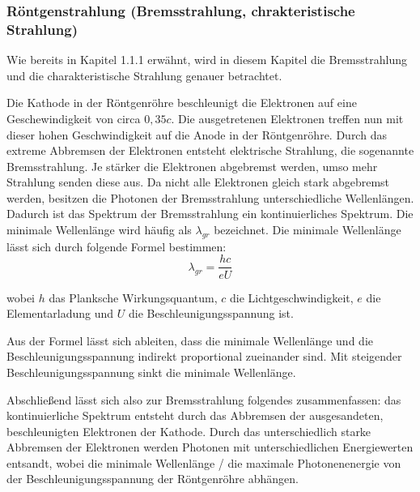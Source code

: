 \documentclass{article}
\begin{document}
\subsubsection{Röntgenstrahlung (Bremsstrahlung, chrakteristische Strahlung)}

\cite[1010--1011; 1384]{Physik}
\cite{leifiphysik_B}
\cite{leifiphysik_C}

Wie bereits in Kapitel 1.1.1 erwähnt, wird in diesem Kapitel die Bremsstrahlung und die charakteristische Strahlung genauer betrachtet.

Die Kathode in der Röntgenröhre beschleunigt die Elektronen auf eine Geschewindigkeit von circa $0,35c$. Die ausgetretenen Elektronen treffen nun mit dieser hohen Geschwindigkeit auf die Anode in der Röntgenröhre. Durch das extreme Abbremsen der Elektronen entsteht elektrische Strahlung, die sogenannte Bremsstrahlung. Je stärker die Elektronen abgebremst werden, umso mehr Strahlung senden diese aus. Da nicht alle Elektronen gleich stark abgebremst werden, besitzen die Photonen der Bremsstrahlung unterschiedliche Wellenlängen. Dadurch ist das Spektrum der Bremsstrahlung ein kontinuierliches Spektrum. Die minimale Wellenlänge wird häufig als $\lambda_{gr}$ bezeichnet. Die minimale Wellenlänge lässt sich durch folgende Formel bestimmen:
\[
    \lambda_{gr}=\frac{hc}{eU}
\]

wobei $h$ das Planksche Wirkungsquantum, $c$ die Lichtgeschwindigkeit, $e$ die Elementarladung und $U$ die Beschleunigungsspannung ist.

Aus der Formel lässt sich ableiten, dass die minimale Wellenlänge und die Beschleunigungsspannung indirekt proportional zueinander sind. Mit steigender Beschleunigungsspannung sinkt die minimale Wellenlänge.

Abschließend lässt sich also zur Bremsstrahlung folgendes zusammenfassen: das kontinuierliche Spektrum entsteht durch das Abbremsen der ausgesandeten, beschleunigten Elektronen der Kathode. Durch das unterschiedlich starke Abbremsen der Elektronen werden Photonen mit unterschiedlichen Energiewerten entsandt, wobei die minimale Wellenlänge / die maximale Photonenenergie von der Beschleunigungsspannung der Röntgenröhre abhängen.
\end{document}

